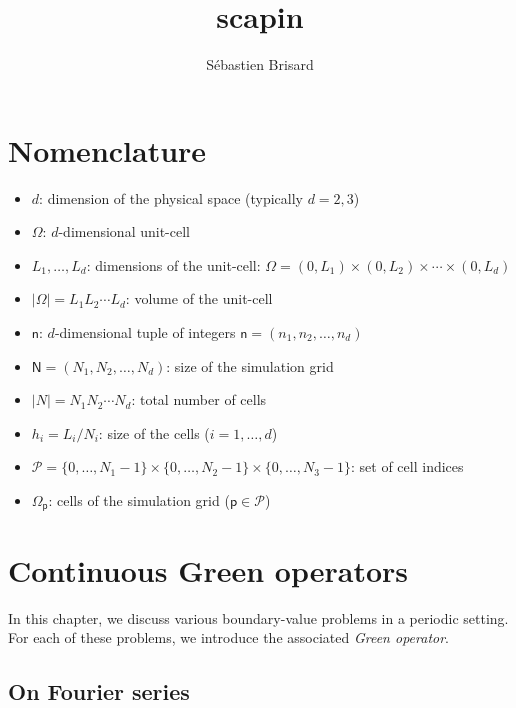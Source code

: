 \documentclass[draft, appendixprefix=true, chapterprefix=true, fontsize=12pt, numbers=noendperiod]{scrbook}
\title{scapin}
\author{Sébastien Brisard}
\newcommand{\cellindices}{\mathcal P}
\newcommand{\tuple}[1]{\mathsf{#1}}
\begin{document}
\maketitle

\chapter{Nomenclature}
\label{cha:20204224074257}

\begin{itemize}
\item \(d\): dimension of the physical space (typically \(d=2, 3\))
\item \(\Omega\): \(d\)-dimensional unit-cell
\item \(L_1,\ldots, L_d\): dimensions of the unit-cell:
  \(\Omega=(0, L_1)\times(0, L_2)\times\cdots\times(0, L_d)\)
\item \(\lvert\Omega\rvert=L_1L_2\cdots L_d\): volume of the unit-cell
\item \(\tuple{n}\): \(d\)-dimensional tuple of integers
  \(\tuple{n}=(n_1, n_2, \ldots, n_d)\)
\item \(\tuple{N}=(N_1, N_2, \ldots, N_d)\): size of the simulation grid
\item \(\lvert N\rvert=N_1N_2\cdots N_d\): total number of cells
\item \(h_i=L_i/N_i\): size of the cells (\(i=1, \ldots, d\))
\item
  \(\cellindices=\{0, \ldots, N_1-1\}\times\{0, \ldots, N_2-1\}\times\{0,
  \ldots, N_3-1\}\): set of cell indices
\item \(\Omega_{\tuple{p}}\): cells of the simulation grid
  (\(\tuple{p}\in\cellindices\))
\end{itemize}

\chapter{Continuous Green operators}
\label{chap:202002060528}

In this chapter, we discuss various boundary-value problems in a periodic
setting. For each of these problems, we introduce the associated \emph{Green
  operator}.

\section{On Fourier series}
\end{document}
